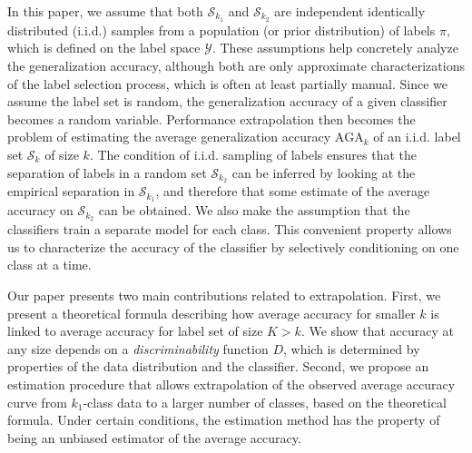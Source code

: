\documentclass[twoside,11pt]{article}
\begin{document}
In this paper, we assume that both $\mathcal{S}_{k_1}$ and
$\mathcal{S}_{k_2}$ are independent identically distributed (i.i.d.)
samples from a population (or prior distribution) of labels $ \pi$, which is
defined on the label space $\mathcal{Y}$.  These assumptions help
concretely analyze the generalization accuracy, although both are only
approximate characterizations of the label selection process, which is
often at least partially manual. Since we assume the label set is
random, the generalization accuracy of a given classifier becomes a
random variable.  Performance extrapolation then becomes the problem
of estimating the average generalization accuracy $\text{AGA}_k$ of an
i.i.d. label set $\mathcal{S}_k$ of size $k$.  The condition of
i.i.d. sampling of labels ensures that the separation of labels in a
random set $\mathcal{S}_{k_2}$ can be inferred by looking at the
empirical separation in $\mathcal{S}_{k_1}$, and therefore that some
estimate of the average accuracy on $\mathcal{S}_{k_2}$ can be
obtained.  We also make the assumption that the classifiers train a
separate model for each class.  This convenient property allows us to
characterize the accuracy of the classifier by selectively
conditioning on one class at a time.

Our paper presents two main contributions related to extrapolation.
First, we present a theoretical formula describing how average accuracy
for smaller $k$ is linked to average accuracy for label set of size
$K>k$.  We show that accuracy at any size depends on a
\emph{discriminability} function ${D}$, which is determined by properties
of the data distribution and the classifier.  Second, we propose an
estimation procedure that allows extrapolation of the observed average
accuracy curve from $k_1$-class data to a larger number of classes,
based on the theoretical formula. Under certain conditions, the
estimation method has the property of being an unbiased estimator of
the average accuracy.
\end{document}
